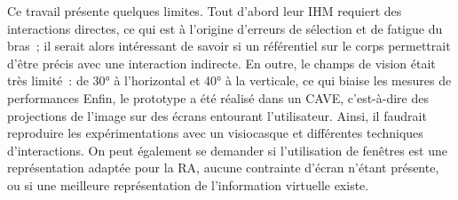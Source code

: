 Ce travail présente quelques limites. Tout d'abord leur IHM requiert des interactions directes, ce qui est à l'origine d'erreurs de sélection et de fatigue du bras~; il serait alors intéressant de savoir si un référentiel sur le corps permettrait d'être précis avec une interaction indirecte. En outre, le champs de vision était très limité~: de 30° à l'horizontal et 40° à la verticale, ce qui biaise les mesures de performances Enfin, le prototype a été réalisé dans un CAVE, c'est-à-dire des projections de l'image sur des écrans entourant l'utilisateur. Ainsi, il faudrait reproduire les expérimentations avec un visiocasque et différentes techniques d'interactions. On peut également se demander si l'utilisation de fenêtres est une représentation adaptée pour la RA, aucune contrainte d'écran n'étant présente, ou si une meilleure représentation de l'information virtuelle existe.


